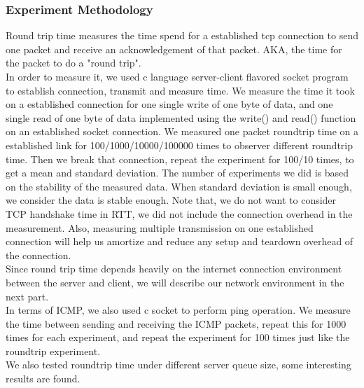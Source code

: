 \documentclass{article} %
\begin{document}
\subsubsection{Experiment Methodology}
Round trip time measures the time spend for a established tcp connection to send one packet and receive an acknowledgement of that packet. AKA, the time for the packet to do a "round trip".\\
In order to measure it, we used c language server-client flavored socket program to establish connection, transmit and measure time. We measure the time it took on a established connection for one single write of one byte of data, and one single read of one byte of data implemented using the write() and read() function on an established socket connection. We measured one packet roundtrip time on a established link for 100/1000/10000/100000 times to observer different roundtrip time. Then we break that connection, repeat the experiment for 100/10 times, to get a mean and standard deviation. The number of experiments we did is based on the stability of the measured data. When standard deviation is small enough, we consider the data is stable enough. Note that, we do not want to consider TCP handshake time in RTT, we did not include the connection overhead in the measurement. Also, measuring multiple transmission on one established connection will help us amortize and reduce any setup and teardown overhead of the connection.\\
Since round trip time depends heavily on the internet connection environment between the server and client, we will describe our network environment in the next part. \\
In terms of ICMP, we also used c socket to perform ping operation. We measure the time between sending and receiving the ICMP packets, repeat this for 1000 times for each experiment, and repeat the experiment for 100 times just like the roundtrip experiment. \\
We also tested roundtrip time under different server queue size, some interesting results are found.\\
\end{document}
